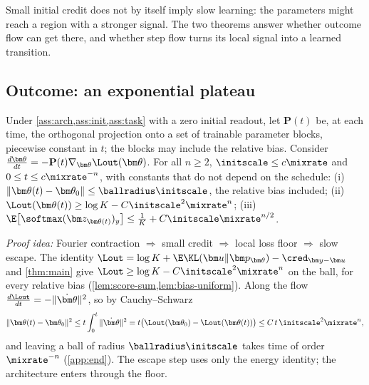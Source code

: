 Small initial credit does not by itself imply slow learning: the parameters might reach a region with a stronger signal. The two
theorems answer whether outcome flow can get there, and whether step flow turns its local signal into a learned transition.

\subsection{Outcome: an exponential plateau}

\begin{theorem}
\label{thm:outcome-end}
Under \cref{ass:arch,ass:init,ass:task} with a zero initial readout, let $\mathbf P(t)$ be, at each time, the orthogonal projection onto a set
of trainable parameter blocks, piecewise constant in $t$; the blocks may include the relative bias. Consider
$\tfrac{d\bm\theta}{dt}=-\mathbf P(t)\nabla_{\bm\theta}\Lout(\bm\theta)$. For all $n\ge2$, $\initscale\le c\mixrate$ and $0\le t\le c\mixrate^{-n}$, with
constants that do not depend on the schedule:
(i)~$\|\bm\theta(t)-\bm\theta_0\|\le\ballradius\initscale$, the relative bias included;
(ii)~$\Lout(\bm\theta(t))\ge\log K-C\initscale^2\mixrate^n$;
(iii)~$\E\bigl[\softmax(\bm z_{\bm\theta(t)})_y\bigr]\le\frac{1}{K}+C\initscale\mixrate^{n/2}$.
\end{theorem}

\emph{Proof idea:} Fourier contraction $\Rightarrow$ small credit $\Rightarrow$ local loss floor $\Rightarrow$ slow escape. The identity
$\Lout=\log K+\E\KL(\bm u\|\bm p_{\bm\theta})-\cred_{\bm y-\bm u}$ and \cref{thm:main} give $\Lout\ge\log K-C\initscale^2\mixrate^n$ on the ball, for
every relative bias (\cref{lem:score-sum,lem:bias-uniform}). Along the flow $\frac{d\Lout}{dt}=-\|\dot{\bm\theta}\|^2$, so by Cauchy--Schwarz
\[
 \|\bm\theta(t)-\bm\theta_0\|^2\le t\int_0^t\|\dot{\bm\theta}\|^2=t\bigl(\Lout(\bm\theta_0)-\Lout(\bm\theta(t))\bigr)\le C\,t\,\initscale^2\mixrate^n,
\]
and leaving a ball of radius $\ballradius\initscale$ takes time of order $\mixrate^{-n}$ (\cref{app:end}). The escape step uses only the energy
identity; the architecture enters through the floor.

